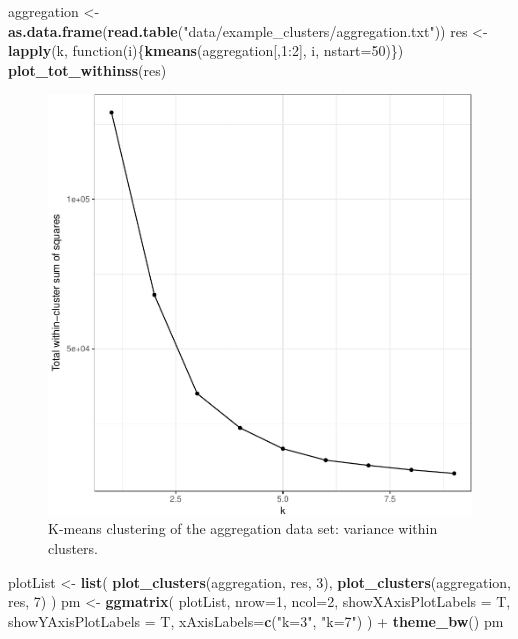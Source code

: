 \documentclass[]{book}
\newenvironment{Shaded}{\begin{snugshade}}{\end{snugshade}}
\newcommand{\KeywordTok}[1]{\textcolor[rgb]{0.13,0.29,0.53}{\textbf{{#1}}}}
\newcommand{\DataTypeTok}[1]{\textcolor[rgb]{0.13,0.29,0.53}{{#1}}}
\newcommand{\DecValTok}[1]{\textcolor[rgb]{0.00,0.00,0.81}{{#1}}}
\newcommand{\StringTok}[1]{\textcolor[rgb]{0.31,0.60,0.02}{{#1}}}
\newcommand{\NormalTok}[1]{{#1}}
\theoremstyle{definition}
\theoremstyle{definition}
\theoremstyle{definition}
\theoremstyle{remark}
\begin{document}
\begin{Shaded}
\begin{Highlighting}[]
\NormalTok{aggregation <-}\StringTok{ }\KeywordTok{as.data.frame}\NormalTok{(}\KeywordTok{read.table}\NormalTok{(}\StringTok{"data/example_clusters/aggregation.txt"}\NormalTok{))}
\NormalTok{res <-}\StringTok{ }\KeywordTok{lapply}\NormalTok{(k, function(i)\{}\KeywordTok{kmeans}\NormalTok{(aggregation[,}\DecValTok{1}\NormalTok{:}\DecValTok{2}\NormalTok{], i, }\DataTypeTok{nstart=}\DecValTok{50}\NormalTok{)\})}
\KeywordTok{plot_tot_withinss}\NormalTok{(res)}
\end{Highlighting}
\end{Shaded}

\begin{figure}

{\centering \includegraphics[width=0.5\linewidth]{09-clustering_files/figure-latex/kmeansAggregationElbow-1} 

}

\caption{K-means clustering of the aggregation data set: variance within clusters.}\label{fig:kmeansAggregationElbow}
\end{figure}

\begin{Shaded}
\begin{Highlighting}[]
\NormalTok{plotList <-}\StringTok{ }\KeywordTok{list}\NormalTok{(}
  \KeywordTok{plot_clusters}\NormalTok{(aggregation, res, }\DecValTok{3}\NormalTok{),}
  \KeywordTok{plot_clusters}\NormalTok{(aggregation, res, }\DecValTok{7}\NormalTok{)}
\NormalTok{)}
\NormalTok{pm <-}\StringTok{ }\KeywordTok{ggmatrix}\NormalTok{(}
  \NormalTok{plotList, }\DataTypeTok{nrow=}\DecValTok{1}\NormalTok{, }\DataTypeTok{ncol=}\DecValTok{2}\NormalTok{, }\DataTypeTok{showXAxisPlotLabels =} \NormalTok{T, }\DataTypeTok{showYAxisPlotLabels =} \NormalTok{T, }
  \DataTypeTok{xAxisLabels=}\KeywordTok{c}\NormalTok{(}\StringTok{"k=3"}\NormalTok{, }\StringTok{"k=7"}\NormalTok{)}
\NormalTok{) +}\StringTok{ }\KeywordTok{theme_bw}\NormalTok{()}
\NormalTok{pm}
\end{Highlighting}
\end{Shaded}
\end{document}
